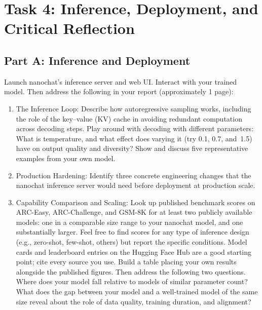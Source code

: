
\section{Task 4: Inference, Deployment, and Critical Reflection}
\label{sec:task4}

\subsection{Part A: Inference and Deployment}

Launch nanochat's inference server and web UI. Interact with your trained model. Then address the following in your report (approximately 1 page):

\begin{enumerate}
    \item The Inference Loop:  Describe how autoregressive sampling works, including the role of the key--value (KV) cache in avoiding redundant computation across decoding steps. Play around with decoding with different parameters: What is temperature, and what effect does varying it (try 0.1, 0.7, and~1.5) have on output quality and diversity?  Show and discuss five representative examples from your own model.
    \item Production Hardening:  Identify three concrete engineering changes that the nanochat inference server would need before deployment at production scale.
    \item Capability Comparison and Scaling:  Look up published benchmark scores on ARC-Easy, ARC-Challenge, and GSM-8K for at least two publicly available models: one in a comparable size range to your nanochat model, and one substantially larger. Feel free to find scores for any type of inference design (e.g., zero-shot, few-shot, others) but report the specific conditions. Model cards and leaderboard entries on the Hugging Face Hub are a good starting point; cite every source you use. Build a table placing your own results alongside the published figures. Then address the following two questions. Where does your model fall relative to models of similar parameter count?  What does the gap between your model and a well-trained model of the same size reveal about the role of data quality, training duration, and alignment?
\end{enumerate}

